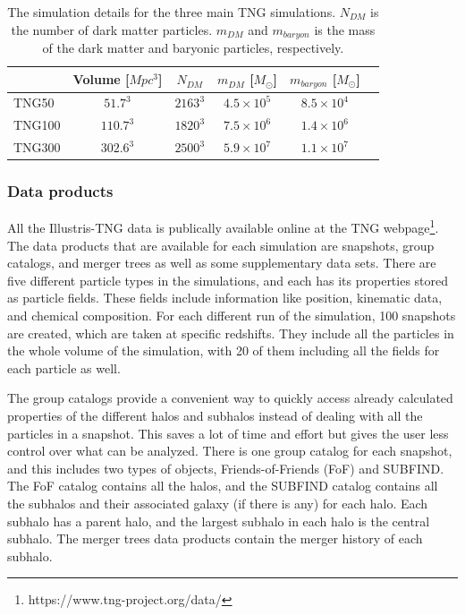 \begin{table}
\begin{center}
\caption{The simulation details for the three main TNG simulations. $N_{DM}$ is the number of dark matter particles. $m_{DM}$ and $m_{baryon}$ is the mass of the dark matter and baryonic particles, respectively.}
 \label{TNG}
\begin{tabular}{ l| c c c c c } 
 \hline
 \hline
   &  Volume [$Mpc^3$] & $N_{DM}$ & $m_{DM}$ [$M_{\odot}$] & $m_{baryon}$ [$M_{\odot}$] \\
 \hline
 TNG50 & $51.7^3$ & $2163^3$ & $4.5 \times 10^5 $ & $8.5 \times 10^4 $ \\ 
 TNG100 & $110.7^3$ & $1820^3$ & $7.5 \times 10^6 $ & $1.4 \times 10^6 $  \\ 
 TNG300 & $302.6^3$ & $2500^3$ & $5.9 \times 10^7 $ & $1.1 \times 10^7 $  \\ 
 \hline 
 \end{tabular}
\end{center}
\end{table}

\subsubsection{Data products}
All the Illustris-TNG data is publically available online at the TNG webpage\footnote{https://www.tng-project.org/data/}. The data products that are available for each simulation are snapshots, group catalogs, and merger trees as well as some supplementary data sets. There are five different particle types in the simulations, and each has its properties stored as particle fields. These fields include information like position, kinematic data, and chemical composition. For each different run of the simulation, 100 snapshots are created, which are taken at specific redshifts. They include all the particles in the whole volume of the simulation, with 20 of them including all the fields for each particle as well.

The group catalogs provide a convenient way to quickly access already calculated properties of the different halos and subhalos instead of dealing with all the particles in a snapshot. This saves a lot of time and effort but gives the user less control over what can be analyzed. There is one group catalog for each snapshot, and this includes two types of objects, Friends-of-Friends (FoF) and SUBFIND. The FoF catalog contains all the halos, and the SUBFIND catalog contains all the subhalos and their associated galaxy (if there is any) for each halo. Each subhalo has a parent halo, and the largest subhalo in each halo is the central subhalo. The merger trees data products contain the merger history of each subhalo.

